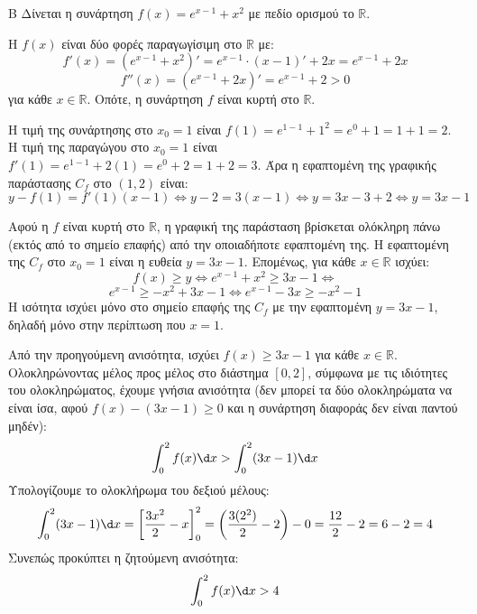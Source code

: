 \begin{thema}{Β}
Δίνεται η συνάρτηση $f(x) = e^{x-1} + x^2$ με πεδίο ορισμού το $\mathbb{R}$.

\begin{erwthma}
\item Η $f(x)$ είναι δύο φορές παραγωγίσιμη στο $\mathbb{R}$ με:
\[ f'(x) = (e^{x-1} + x^2)' = e^{x-1}\cdot(x-1)' + 2x = e^{x-1} + 2x \]
\[ f''(x) = (e^{x-1} + 2x)' = e^{x-1} + 2>0 \] για κάθε $x \in \mathbb{R}$. Οπότε, η συνάρτηση $f$ είναι κυρτή στο $\mathbb{R}$.
\item Η τιμή της συνάρτησης στο $x_0 = 1$ είναι $f(1) = e^{1-1} + 1^2 = e^0 + 1 = 1 + 1 = 2$.
Η τιμή της παραγώγου στο $x_0 = 1$ είναι $f'(1) = e^{1-1} + 2(1) = e^0 + 2 = 1 + 2 = 3$.
Άρα η εφαπτομένη της γραφικής παράστασης $C_f$ στο $(1, 2)$ είναι:
\[ y - f(1) = f'(1)(x-1) \Leftrightarrow y - 2 = 3(x-1) \Leftrightarrow y = 3x - 3 + 2 \Leftrightarrow y = 3x - 1 \]

\item Αφού η $f$ είναι κυρτή στο $\mathbb{R}$, η γραφική της παράσταση βρίσκεται ολόκληρη πάνω (εκτός από το σημείο επαφής) από την οποιαδήποτε εφαπτομένη της.
Η εφαπτομένη της $C_f$ στο $x_0 = 1$ είναι η ευθεία $y = 3x - 1$. Επομένως, για κάθε $x \in \mathbb{R}$ ισχύει:
\[ f(x) \ge y \Leftrightarrow e^{x-1} + x^2 \ge 3x - 1 \Leftrightarrow \]
\[ e^{x-1} \ge -x^2 + 3x - 1 \Leftrightarrow e^{x-1} - 3x \ge -x^2 - 1 \]
Η ισότητα ισχύει μόνο στο σημείο επαφής της $C_f$ με την εφαπτομένη $y=3x-1$, δηλαδή μόνο στην περίπτωση που $x = 1$.

\item Από την προηγούμενη ανισότητα, ισχύει $f(x) \ge 3x - 1$ για κάθε $x \in \mathbb{R}$. Ολοκληρώνοντας μέλος προς μέλος στο διάστημα $[0, 2]$, σύμφωνα με τις ιδιότητες του ολοκληρώματος, έχουμε γνήσια ανισότητα (δεν μπορεί τα δύο ολοκληρώματα να είναι ίσα, αφού $f(x) - (3x-1) \ge 0$ και η συνάρτηση διαφοράς δεν είναι παντού μηδέν):
\[ \int_0^2 f(x) \d x > \int_0^2 (3x - 1) \d x \]
Υπολογίζουμε το ολοκλήρωμα του δεξιού μέλους:
\[ \int_0^2 (3x - 1) \d x = \left[ \dfrac{3x^2}{2} - x \right]_0^2 = \left( \dfrac{3(2^2)}{2} - 2 \right) - 0 = \dfrac{12}{2} - 2 = 6 - 2 = 4 \]
Συνεπώς προκύπτει η ζητούμενη ανισότητα:
\[ \int_0^2 f(x) \d x > 4 \]
\end{erwthma}
\end{thema}

